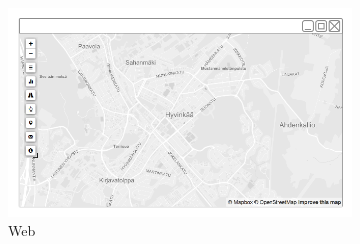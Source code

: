 \begin{figure}[ht]
    \centering
    \begin{subfigure}[b]{0.6\textwidth}
        \includegraphics[width=\textwidth]
          {img/c02-application/png/web-basemap.png}
        \caption{Web}
    \end{subfigure}
    ~
    \begin{subfigure}[b]{0.2\textwidth}

\end{subfigure}
\end{figure}
